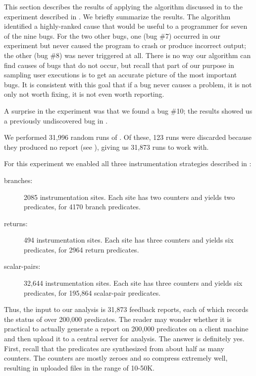 This section describes the results of applying the algorithm discussed
in  to the experiment described in
.  We briefly summarize the results.
The algorithm identified a highly-ranked cause that would be useful to a programmer
for seven of the nine bugs.  For the two other bugs,
one (bug \#7) occurred in our experiment but never caused
the program to crash or produce incorrect output; the other (bug \#8) was never
triggered at all.  There is no way our algorithm can find causes of bugs that do not
occur, but recall that part of our purpose in sampling user executions
is to get an accurate picture of the most important bugs. It is consistent with
this goal that if a bug never causes a problem, it is not only not worth fixing,
it is not even worth reporting.

A surprise in the experiment was that we found a bug \#10; the results
showed us a previously undiscovered bug in \moss.

We performed 31,996 random runs of \moss.  Of these, 123 runs were
discarded because they produced no report (see
), giving us 31,873 runs to work with.

For this experiment we enabled all three instrumentation strategies
described in :

\begin{description}
\item[branches:] 2085 instrumentation sites.  Each site has two
  counters and yields two predicates, for 4170 branch predicates.

\item[returns:] 494 instrumentation sites.  Each site has three
  counters and yields six predicates, for 2964 return predicates.

\item[scalar-pairs:] 32,644 instrumentation sites.  Each site has
  three counters and yields six predicates, for 195,864 scalar-pair
  predicates.
\end{description}

Thus, the input to our analysis is 31,873 feedback reports, each of
which records the status of over 200,000 predicates.  The reader may
wonder whether it is practical to actually generate a report on
200,000 predicates on a client machine and then upload it to a central
server for analysis.  The answer is definitely yes.  First, recall
that the predicates are synthesized from about half as many counters.
The counters are mostly zeroes and so compress extremely well,
resulting in uploaded files in the range of 10-50K.

